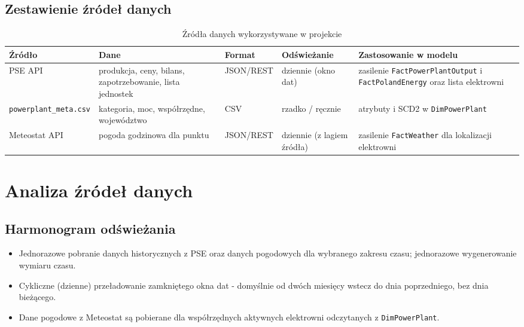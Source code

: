 \documentclass[12pt]{article}
\begin{document}
	\subsection{Zestawienie źródeł danych}

	\begin{table}[h!]
		\centering
		\small
		\begin{tabularx}{\textwidth}{|p{3.0cm}|p{3.1cm}|p{2.1cm}|p{2.4cm}|X|}
			\hline
			\textbf{Źródło} & \textbf{Dane} & \textbf{Format} & \textbf{Odświeżanie} & \textbf{Zastosowanie w modelu} \\
			\hline
			PSE API & produkcja, ceny, bilans, zapotrzebowanie, lista jednostek & JSON/REST & dziennie (okno dat) & zasilenie \texttt{FactPowerPlantOutput} i \texttt{FactPolandEnergy} oraz lista elektrowni \\
			\hline
			\texttt{powerplant\_meta.csv} & kategoria, moc, współrzędne, województwo & CSV & rzadko / ręcznie & atrybuty i SCD2 w \texttt{DimPowerPlant} \\
			\hline
			Meteostat API & pogoda godzinowa dla punktu & JSON/REST & dziennie (z lagiem źródła) & zasilenie \texttt{FactWeather} dla lokalizacji elektrowni \\
			\hline
		\end{tabularx}
		\caption{Źródła danych wykorzystywane w projekcie}
	\end{table}

	\section{Analiza źródeł danych}

	\subsection{Harmonogram odświeżania}
	\begin{itemize}
		\item Jednorazowe pobranie danych historycznych z PSE oraz danych pogodowych dla wybranego zakresu czasu; jednorazowe wygenerowanie wymiaru czasu.
		\item Cykliczne (dzienne) przeładowanie zamkniętego okna dat - domyślnie od dwóch miesięcy wstecz do dnia poprzedniego, bez dnia bieżącego.
		\item Dane pogodowe z Meteostat są pobierane dla współrzędnych aktywnych elektrowni odczytanych z \texttt{DimPowerPlant}.
	\end{itemize}
\end{document}

